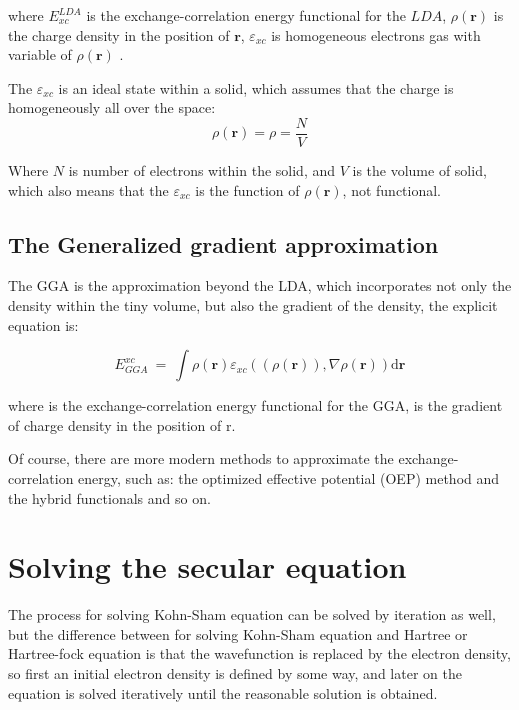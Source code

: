 \documentclass[a4paper, 12pt, titlepage,oneside,drop]{kthesis}
\begin{document}
\noindent where $ E^\textit{LDA}_\textit{xc} $ is the exchange-correlation energy functional for the $LDA$, $\rho(\textbf{r})$ is the charge density in the position of $\textbf{r}$, $\varepsilon_\textit{xc}$ is homogeneous 
electrons gas with variable of  $\rho(\textbf{r})$ .

\noindent The $\varepsilon_\textit{xc}$ is an ideal state within a solid, which assumes that the charge is homogeneously all over the space:
\begin{equation}
 \rho(\textbf{r}) = \rho = \frac{N}{V}
\end{equation}

\noindent Where $N$ is number of electrons within the solid, and $V$ is the volume of solid, which also means that the $\varepsilon_\textit{xc}$ is the function of $\rho(\textbf{r})$,
 not functional. 
\subsection{The Generalized gradient approximation}
\noindent The GGA is the approximation beyond the LDA, which incorporates not only the density within the tiny volume, but also the gradient
 of the density, the explicit equation is:

\begin{equation}
E_{\textit{GGA}}^{\textit{xc}}\ = \ \int \rho(\textbf{r}) \varepsilon_\textit{xc}( (\rho(\textbf{r})), \nabla \rho(\textbf{r}) ) \mathrm{d} \textbf{r} 
\end{equation}

\noindent where  is the exchange-correlation energy functional for the GGA,  is the gradient  of charge density in the position of r.

\noindent Of course, there are more modern methods to approximate the exchange-correlation energy, such as: the optimized effective potential
(OEP) method and the hybrid functionals and so on.

\section{Solving the secular equation}
\noindent The process for solving Kohn-Sham equation can be solved by iteration as well, but the difference between for solving Kohn-Sham 
equation and Hartree or Hartree-fock equation is that the wavefunction is replaced by the electron density, so first an initial 
electron density is defined by some way, and later on the equation is solved iteratively until the reasonable solution is obtained.
\end{document}
